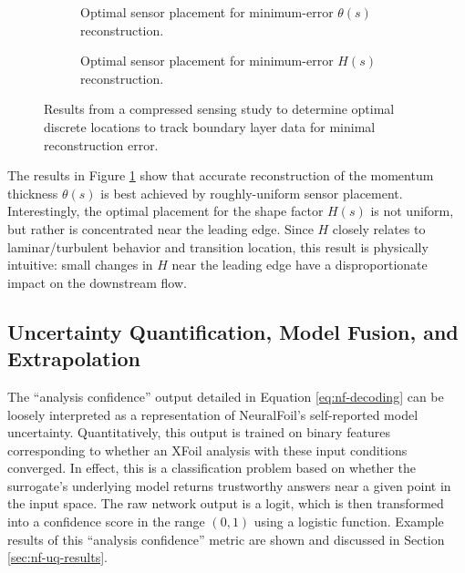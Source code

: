 \begin{figure}[H]
    \centering
    \begin{subfigure}[t]{0.49\textwidth}
        \centering
        
        \caption{Optimal sensor placement for minimum-error $\theta(s)$ reconstruction.}
    \end{subfigure}
    \begin{subfigure}[t]{0.49\textwidth}
        \centering
        
        \caption{Optimal sensor placement for minimum-error $H(s)$ reconstruction.}
    \end{subfigure}
    \caption{Results from a compressed sensing study to determine optimal discrete locations to track boundary layer data for minimal reconstruction error.}
    \label{fig:optimal_sensor_placement}
\end{figure}

The results in Figure \ref{fig:optimal_sensor_placement} show that accurate reconstruction of the momentum thickness $\theta(s)$ is best achieved by roughly-uniform sensor placement. Interestingly, the optimal placement for the shape factor $H(s)$ is not uniform, but rather is concentrated near the leading edge. Since $H$ closely relates to laminar/turbulent behavior and transition location, this result is physically intuitive: small changes in $H$ near the leading edge have a disproportionate impact on the downstream flow.

\subsection{Uncertainty Quantification, Model Fusion, and Extrapolation}
\label{sec:nf-uq}

The ``analysis confidence'' output detailed in Equation \ref{eq:nf-decoding} can be loosely interpreted as a representation of NeuralFoil's self-reported model uncertainty. Quantitatively, this output is trained on binary features corresponding to whether an XFoil analysis with these input conditions converged. In effect, this is a classification problem based on whether the surrogate's underlying model returns trustworthy answers near a given point in the input space. The raw network output is a logit, which is then transformed into a confidence score in the range $(0, 1)$ using a logistic function. Example results of this ``analysis confidence'' metric are shown and discussed in Section \ref{sec:nf-uq-results}.

